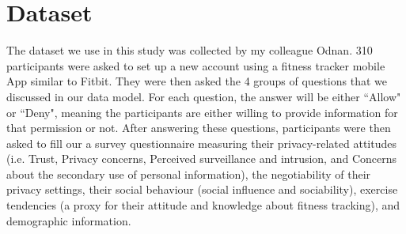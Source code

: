 \section{Dataset}
The dataset we use in this study was collected by my colleague Odnan. 310 participants were asked to set up a new account using a fitness tracker mobile App similar to Fitbit. They were then asked the 4 groups of questions that we discussed in our data model. For each question, the answer will be either ``Allow" or ``Deny", meaning the participants are either willing to provide information for that permission or not. After answering these questions, participants were then asked to fill our a survey questionnaire measuring their privacy-related attitudes (i.e. Trust, Privacy concerns, Perceived surveillance and intrusion, and Concerns about the secondary use of personal information), the negotiability of their privacy settings, their social behaviour (social influence and sociability), exercise tendencies (a proxy for their attitude and knowledge about fitness tracking), and demographic information.


